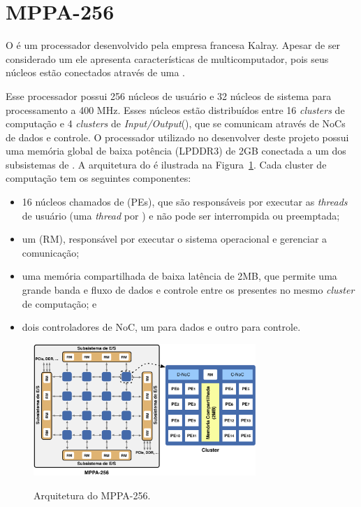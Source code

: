 \section{MPPA-256}
\label{sec:mppa}

O \mppa é um processador \manycore desenvolvido pela empresa francesa Kalray. Apesar de ser considerado um \manycore ele apresenta características de multicomputador, pois seus núcleos estão conectados através de uma \noc.

Esse processador possui 256 núcleos de usuário e 32 núcleos de sistema para processamento a 400 MHz. Esses núcleos estão distribuídos entre 16 \textit{clusters} de computação e 4 \textit{clusters} de \textit{Input/Output}(\io), que se comunicam através de NoCs de dados e controle. O processador utilizado no desenvolver deste projeto possui uma memória global de baixa potência (LPDDR3) de 2GB conectada a um dos subsistemas de \io. A arquitetura do \mppa é ilustrada na Figura~\ref{fig:mppaOverall}. Cada cluster de computação tem os seguintes componentes:

\begin{itemize}
    \item 16 núcleos chamados de \pes (PEs), que são responsáveis por executar as \textit{threads} de usuário (uma \textit{thread} por \pe) e não pode ser interrompida ou preemptada;
    
    \item um \rman (RM), responsável por executar o sistema operacional e gerenciar a comunicação;
    
    \item uma memória compartilhada de baixa latência de 2MB, que permite uma grande banda e fluxo de dados e controle entre os \pes presentes no mesmo \textit{cluster} de computação; e
    
    \item dois controladores de NoC, um para dados e outro para controle.
    
\end{itemize}

\begin{figure}
    \centering
    \caption{Arquitetura do MPPA-256.}
    \includegraphics[width=0.75\textwidth]{figs/mppa-overview.pdf} \\
    \label{fig:mppaOverall}
\end{figure}

